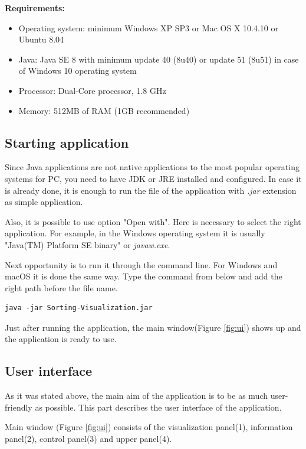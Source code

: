 \documentclass[
  field=inf,
  biblatex,
  language=english,
  glossaries,
  theorems=false,
  sourcecodes=false,
  index
]{kidiplom}
\begin{document}
\noindent \textbf{Requirements:}
\begin{itemize}
	\item Operating system: minimum Windows XP SP3 or Mac OS X 10.4.10 or Ubuntu 8.04 
	\item Java: Java SE 8 with minimum update 40 (8u40) or update 51 (8u51) in case of Windows 10 operating system
	\item Processor: Dual-Core processor, 1.8 GHz
	\item Memory: 512MB of RAM (1GB recommended)
\end{itemize}

\subsection{Starting application}

Since Java applications are not native applications to the most popular operating systems for PC, you need to have JDK or JRE installed and configured. In case it is already done, it is enough to run the file of the application with \textit{.jar} extension as simple application.

Also, it is possible to use option "Open with". Here is necessary to select the right application. For example, in the Windows operating system it is usually "Java(TM) Platform SE binary" or \textit{javaw.exe}.

Next opportunity is to run it through the command line. For Windows and macOS it is done the same way. Type the command from below and add the right path before the file name. 
\begin{lstlisting}
java -jar Sorting-Visualization.jar
\end{lstlisting}

Just after running the application, the main window(Figure \ref{fig:ui}) shows up and the application is ready to use.

\subsection{User interface}

As it was stated above, the main aim of the application is to be as much user-friendly as possible. This part describes the user interface of the application.

Main window (Figure \ref{fig:ui}) consists of the visualization panel(1), information panel(2), control panel(3) and upper panel(4).
\end{document}

